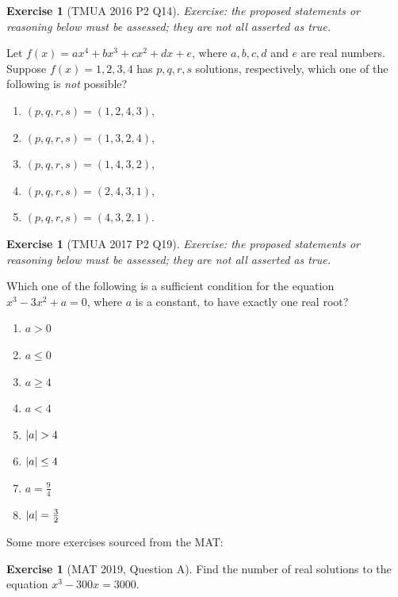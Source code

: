 \documentclass[11pt]{article}
\theoremstyle{definition}
\newtheorem{example}[theorem]{Exercise}
\theoremstyle{remark}
\newcommand{\pqty}[1]{\left(#1\right)}
\DeclarePairedDelimiter{\abs}{\lvert}{\rvert}
\begin{document}
\begin{example}[TMUA 2016 P2 Q14]\label{tmua-2-unit-011}
\textit{Exercise: the proposed statements or reasoning below must be assessed; they are not all asserted as true.}\par

    Let \(f\pqty{x} = a x^4 + b x^3 + c x^2 + d x + e\), where \(a, b, c, d\) and \(e\) are real numbers. Suppose \(f\pqty{x} = 1, 2, 3, 4\) has \(p, q, r, s\) solutions, respectively, which one of the following is \emph{not} possible?
    \begin{enumerate}
        \item \(\pqty{p, q, r, s} = \pqty{1, 2, 4, 3}\),
        \item \(\pqty{p, q, r, s} = \pqty{1, 3, 2, 4}\),
        \item \(\pqty{p, q, r, s} = \pqty{1, 4, 3, 2}\),
        \item \(\pqty{p, q, r, s} = \pqty{2, 4, 3, 1}\),
        \item \(\pqty{p, q, r, s} = \pqty{4, 3, 2, 1}\).
    \end{enumerate}
\end{example}

\begin{example}[TMUA 2017 P2 Q19]\label{tmua-2-unit-012}
\textit{Exercise: the proposed statements or reasoning below must be assessed; they are not all asserted as true.}\par

    Which one of the following is a sufficient condition for the equation \(x^3 - 3 x^2 + a = 0\), where \(a\) is a constant, to have exactly one real root?
    \begin{enumerate}
        \item \(a > 0\)
        \item \(a \leq 0\)
        \item \(a \geq 4\)
        \item \(a < 4\)
        \item \(\abs{a} > 4\)
        \item \(\abs{a} \leq 4\)
        \item \(a = \frac{9}{4}\)
        \item \(\abs{a} = \frac{3}{2}\)
    \end{enumerate}
\end{example}

Some more exercises sourced from the MAT:
\begin{example}[MAT 2019, Question A]\label{tmua-2-unit-013}
    Find the number of real solutions to the equation \(x^3 - 300 x = 3000\).
\end{example}
\end{document}
